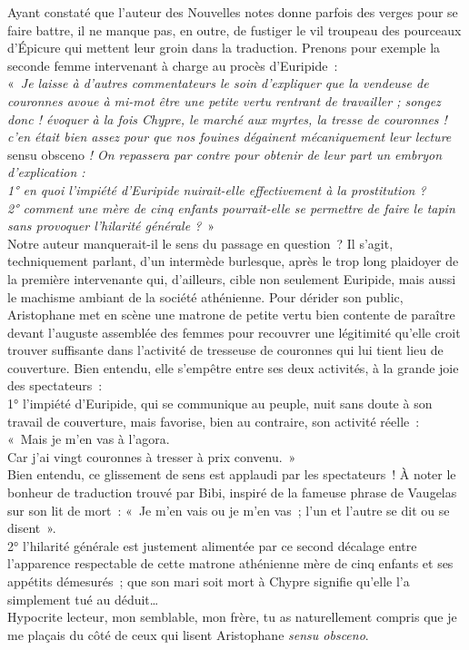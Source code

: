 \documentclass{book}%
\newcommand{\italique}[1]{\textit{#1}}%
\begin{document}
Ayant constaté que l’auteur des Nouvelles notes donne parfois des verges pour se faire battre, il ne manque pas, en outre, de fustiger le vil troupeau des pourceaux d’Épicure qui mettent leur groin dans la traduction. 
Prenons pour exemple la seconde femme intervenant à charge au procès d’Euripide : \\
« \italique{Je laisse à d’autres commentateurs le soin d’expliquer que la vendeuse de couronnes avoue à mi-mot être une petite vertu rentrant de travailler ; songez donc ! évoquer à la fois Chypre, le marché aux myrtes, la tresse de couronnes ! c’en était bien assez pour que nos fouines dégainent mécaniquement leur lecture }sensu obsceno\italique{ ! On repassera par contre pour obtenir de leur part un embryon d’explication :\\
1° en quoi l’impiété d’Euripide nuirait-elle effectivement à la prostitution ?\\
2° comment une mère de cinq enfants pourrait-elle se permettre de faire le tapin sans provoquer l’hilarité générale ?} » \\
Notre auteur manquerait-il le sens du passage en question ? Il s’agit, techniquement parlant, d’un intermède burlesque, après le trop long plaidoyer de la première intervenante qui, d’ailleurs, cible non seulement Euripide, mais aussi le machisme ambiant de la société athénienne. 
Pour dérider son public, Aristophane met en scène une matrone de petite vertu bien contente de paraître devant l’auguste assemblée des femmes pour recouvrer une légitimité qu’elle croit trouver suffisante dans l’activité de tresseuse de couronnes qui lui tient lieu de couverture. Bien entendu, elle s’empêtre entre ses deux activités, à la grande joie des spectateurs :\\
1° l’impiété d’Euripide, qui se communique au peuple, nuit sans doute à son travail de couverture, mais favorise, bien au contraire, son activité réelle : \\
« Mais je m’en vas à l’agora.\\
Car j’ai vingt couronnes à tresser à prix convenu. » \\
Bien entendu, ce glissement de sens est applaudi par les spectateurs ! À noter le bonheur de traduction trouvé par Bibi, inspiré de la fameuse phrase de Vaugelas sur son lit de mort : « Je m’en vais ou je m’en vas ; l’un et l’autre se dit ou se disent ».\\
2° l’hilarité générale est justement alimentée par ce second décalage entre l’apparence respectable de cette matrone athénienne mère de cinq enfants et ses appétits démesurés ; que son mari soit mort à Chypre signifie qu’elle l’a simplement tué au déduit… \\
Hypocrite lecteur, mon semblable, mon frère, tu as naturellement compris que je me plaçais du côté de ceux qui lisent Aristophane \italique{sensu obsceno}.
\end{document}
